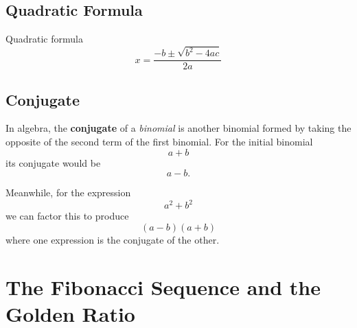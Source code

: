 \section{Quadratic Formula}
Quadratic formula
\begin{equation}
  x=\frac{-b\pm\sqrt{b^2-4ac}}{2a}
  \label{app:eq:quadratic}
\end{equation}

\section{Conjugate}\label{app:def:conjugate}

In algebra, the \textbf{conjugate} of a \emph{binomial} is another binomial formed by taking the opposite of the second term of the first binomial. For the initial binomial
\[ a + b\]
its conjugate would be
\[a - b.\]

Meanwhile, for the expression \[a^2+b^2\] we can factor this to produce \[(a-b)(a+b)\] where one expression is the conjugate of the other.



\chapter{The Fibonacci Sequence and the Golden Ratio}

